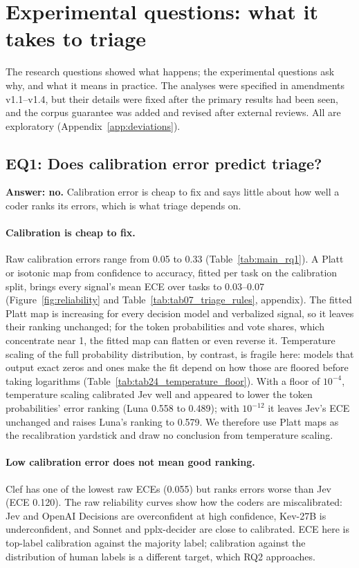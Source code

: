 \FloatBarrier
\section{Experimental questions: what it takes to triage}
\label{sec:eqs}

The research questions showed what happens; the experimental questions ask why, and what it means in practice. The analyses
were specified in amendments v1.1--v1.4, but their details were fixed after the primary results had been seen, and the corpus
guarantee was added and revised after external reviews. All are exploratory (Appendix~\ref{app:deviations}).

\subsection{EQ1: Does calibration error predict triage?}
\label{sec:eq1}

\textbf{Answer: no.} Calibration error is cheap to fix and says little about how well a coder ranks its errors, which is what
triage depends on.

\paragraph{Calibration is cheap to fix.} Raw calibration errors range from 0.05 to 0.33 (Table~\ref{tab:main_rq1}). A Platt or
isotonic map from confidence to accuracy, fitted per task on the calibration split, brings every signal's mean ECE over tasks
to 0.03--0.07 (Figure~\ref{fig:reliability} and Table~\ref{tab:tab07_triage_rules}, appendix). The fitted Platt map is
increasing for every decision model and verbalized signal, so it leaves their ranking unchanged; for the token probabilities
and vote shares, which concentrate near 1, the fitted map can flatten or even reverse it.
Temperature scaling of the full probability distribution, by contrast, is fragile here: models that output exact zeros and
ones make the fit depend on how those are floored before taking logarithms (Table~\ref{tab:tab24_temperature_floor}). With a
floor of $10^{-4}$, temperature scaling calibrated Jev well and appeared to lower the token probabilities' error ranking (Luna
0.558 to 0.489); with $10^{-12}$ it leaves Jev's ECE unchanged and raises Luna's ranking to 0.579. We therefore use Platt maps
as the recalibration yardstick and draw no conclusion from temperature scaling.

\paragraph{Low calibration error does not mean good ranking.} Clef has one of the lowest raw ECEs (0.055) but ranks errors
worse than Jev (ECE 0.120). The raw reliability curves show how the coders are miscalibrated: Jev and OpenAI Decisions are
overconfident at high confidence, Kev-27B is underconfident, and Sonnet and pplx-decider are close to calibrated. ECE here is
top-label calibration against the majority label; calibration against the distribution of human labels
\citep{baan2022stop} is a different target, which RQ2 approaches.

